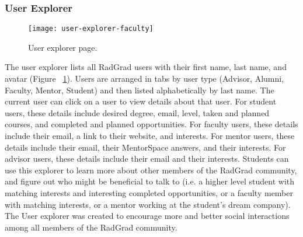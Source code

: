\subsubsection{User Explorer}

\begin{figure}[htbp!]
\centering
\texttt{[image: user-explorer-faculty]}
\caption{User explorer page.}
\label{user-explorer-faculty}
\end{figure}

The user explorer lists all RadGrad users with their first name, last name, and avatar (Figure ~\ref{user-explorer-faculty}). Users are arranged in tabs by user type (Advisor, Alumni, Faculty, Mentor, Student) and then listed alphabetically by last name. The current user can click on a user to view details about that user. For student users, these details include desired degree, email, level, taken and planned courses, and completed and planned opportunities. For faculty users, these details include their email, a link to their website, and interests. For mentor users, these details include their email, their MentorSpace answers, and their interests. For advisor users, these details include their email and their interests. Students can use this explorer to learn more about other members of the RadGrad community, and figure out who might be beneficial to talk to (i.e. a higher level student with matching interests and interesting completed opportunities, or a faculty member with matching interests, or a mentor working at the student's dream company). The User explorer was created to encourage more and better social interactions among all members of the RadGrad community.

